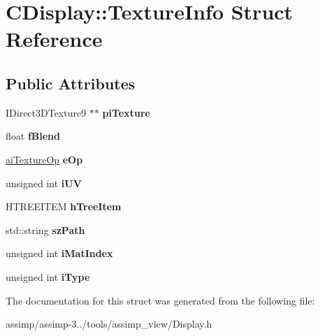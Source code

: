 \hypertarget{struct_c_display_1_1_texture_info}{\section{C\+Display\+:\+:Texture\+Info Struct Reference}
\label{struct_c_display_1_1_texture_info}
}
\subsection*{Public Attributes}
\begin{DoxyCompactItemize}
\item 
\hypertarget{struct_c_display_1_1_texture_info_aec6732ab7fff408b4dd7b4d1e501e7b0}{I\+Direct3\+D\+Texture9 $\ast$$\ast$ {\bfseries pi\+Texture}}\label{struct_c_display_1_1_texture_info_aec6732ab7fff408b4dd7b4d1e501e7b0}

\item 
\hypertarget{struct_c_display_1_1_texture_info_a7962ffe111dcbbd6b6c9b72de200f5a6}{float {\bfseries f\+Blend}}\label{struct_c_display_1_1_texture_info_a7962ffe111dcbbd6b6c9b72de200f5a6}

\item 
\hypertarget{struct_c_display_1_1_texture_info_a229ac1a66232f254e20477146936d13c}{\hyperlink{material_8h_afcd3096d69affba13114cedfc6f9ee6b}{ai\+Texture\+Op} {\bfseries e\+Op}}\label{struct_c_display_1_1_texture_info_a229ac1a66232f254e20477146936d13c}

\item 
\hypertarget{struct_c_display_1_1_texture_info_a4292bf569a8fff0c515550fcab33e2be}{unsigned int {\bfseries i\+U\+V}}\label{struct_c_display_1_1_texture_info_a4292bf569a8fff0c515550fcab33e2be}

\item 
\hypertarget{struct_c_display_1_1_texture_info_a1a5b8321486f17a460c6b50175ca81d3}{H\+T\+R\+E\+E\+I\+T\+E\+M {\bfseries h\+Tree\+Item}}\label{struct_c_display_1_1_texture_info_a1a5b8321486f17a460c6b50175ca81d3}

\item 
\hypertarget{struct_c_display_1_1_texture_info_aa8fc0ae45107d73f168127e133fa0bb1}{std\+::string {\bfseries sz\+Path}}\label{struct_c_display_1_1_texture_info_aa8fc0ae45107d73f168127e133fa0bb1}

\item 
\hypertarget{struct_c_display_1_1_texture_info_a42c520970bebbaccaf3a6cba285bad3b}{unsigned int {\bfseries i\+Mat\+Index}}\label{struct_c_display_1_1_texture_info_a42c520970bebbaccaf3a6cba285bad3b}

\item 
\hypertarget{struct_c_display_1_1_texture_info_acfa1da3328873065110e471f392d2383}{unsigned int {\bfseries i\+Type}}\label{struct_c_display_1_1_texture_info_acfa1da3328873065110e471f392d2383}

\end{DoxyCompactItemize}


The documentation for this struct was generated from the following file\+:\begin{DoxyCompactItemize}
\item 
assimp/assimp-\/3../tools/assimp\+\_\+view/Display.\+h\end{DoxyCompactItemize}
